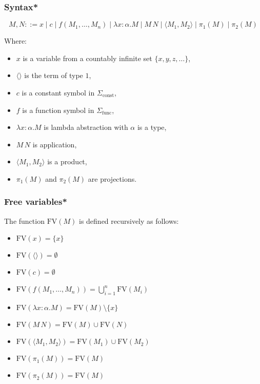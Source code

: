 \documentclass[aspectratio=169]{beamer}
\begin{document}
\begin{frame}
\frametitle{Syntax*}

\[
M, N ::= x \mid c \mid f(M_1, \ldots, M_n) \mid \lambda x: \alpha. M \mid M \, N \mid \langle M_1, M_2 \rangle \mid \pi_1(M) \mid \pi_2(M)
\]

Where:
\begin{itemize}
    \item $x$ is a variable from a countably infinite set $\{x, y, z, \ldots \}$,
    \item $\langle \rangle$ is the term of type $1$,
    \item $c$ is a constant symbol in $\Sigma_{\text{const}}$,
    \item $f$ is a function symbol in $\Sigma_{\text{func}}$,
    \item $\lambda x: \alpha. M$ is lambda abstraction with $\alpha$ is a type,
    \item $M\, N$ is application,
    \item $\langle M_1, M_2 \rangle$ is a product,
    \item $\pi_1(M)$ and $\pi_2(M)$ are projections.
\end{itemize}
\end{frame}

\begin{frame}
\frametitle{Free variables*}
The function $\text{FV}(M)$ is defined recursively as follows:
\begin{itemize}
    \item $\text{FV}(x) = \{x\}$
    \item $\text{FV}(\langle \rangle) = \emptyset$
    \item $\text{FV}(c) = \emptyset$
    \item $\text{FV}(f(M_1, \ldots, M_n)) = \bigcup_{i=1}^{n} \text{FV}(M_i)$
    \item $\text{FV}(\lambda x: \alpha. M) = \text{FV}(M) \setminus \{x\}$
    \item $\text{FV}(M \, N) = \text{FV}(M) \cup \text{FV}(N)$
    \item $\text{FV}(\langle M_1, M_2 \rangle) = \text{FV}(M_1) \cup \text{FV}(M_2)$
    \item $\text{FV}(\pi_1(M)) = \text{FV}(M)$
    \item $\text{FV}(\pi_2(M)) = \text{FV}(M)$
\end{itemize}
\end{frame}
\end{document}
